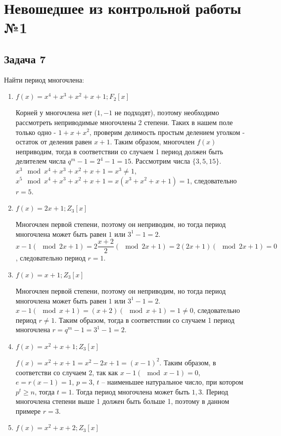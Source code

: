 \documentclass[12pt]{extarticle}
\begin{document}
\section{Невошедшее из контрольной работы №1}

\subsection{Задача 7}
Найти период многочлена:
\begin{enumerate}
    \item $f(x)=x^4+x^3+x^2+x+1; F_2[x]$
    
    Корней у многочлена нет ($1,-1$ не подходят), поэтому необходимо рассмотреть неприводимые многочлены 2 степени. Таких в нашем поле только одно - $1 + x + x^2$, проверим делимость простым делением уголком - остаток от деления равен $x+1$. Таким образом, многочлен $f(x)$ неприводим, тогда в соответствии со случаем 1 период должен быть делителем числа $ q^m -1 = 2^4 - 1 = 15$. Рассмотрим числа $\{3, 5, 15\}$. $x^3 \mod x^4+x^3+x^2+x+1 = x^3 \neq 1$, $x^5 \mod x^4+x^3+x^2+x+1 = x(x^3+x^2+x+1) = 1$, следовательно $r= 5$.

    \item $f(x)=2x+1; Z_3[x]$
    
    Многочлен первой степени, поэтому он неприводим, но тогда период многочлена может быть равен $1$ или $3^1-1 = 2$. $x -1 (\mod{2x + 1}) = 2\dfrac{x + 2}{2} (\mod{2x + 1}) = 2(2x + 1) (\mod{2x + 1}) = 0$, следовательно период $r = 1$.
    
    \item $f(x)=x+1; Z_3[x]$
    
    Многочлен первой степени, поэтому он неприводим, но тогда период многочлена может быть равен $1$ или $3^1-1 = 2$. $x - 1 (\mod{x + 1}) = (x + 2) (\mod{x + 1}) = 1 \neq 0$, следовательно период $r \neq 1$. Таким образом, тогда в соответствии со случаем 1 период многочлена $r = q^m -1 = 3^1 -1 = 2$.
    
    \item $f(x)=x^2+x+1; Z_3[x]$
    
    $f(x) = x^2 + x + 1 = x^2 -2x +1 = (x - 1)^2$. Таким образом, в соответстви со случаем 2, так как $x - 1 (\mod{x - 1}) = 0$, $e = r(x-1) = 1$, $p = 3$, $t$ – наименьшее натуральное число, при котором $p^t\geq n$, тогда $t = 1$. Тогда период многочлена может быть ${1, 3}$. Период многочлена степени выше 1 должен быть больше 1, поэтому в данном примере $r = 3$.

    \item $f(x)=x^2+x+2; Z_3[x]$
    

\end{enumerate}
\end{document}
